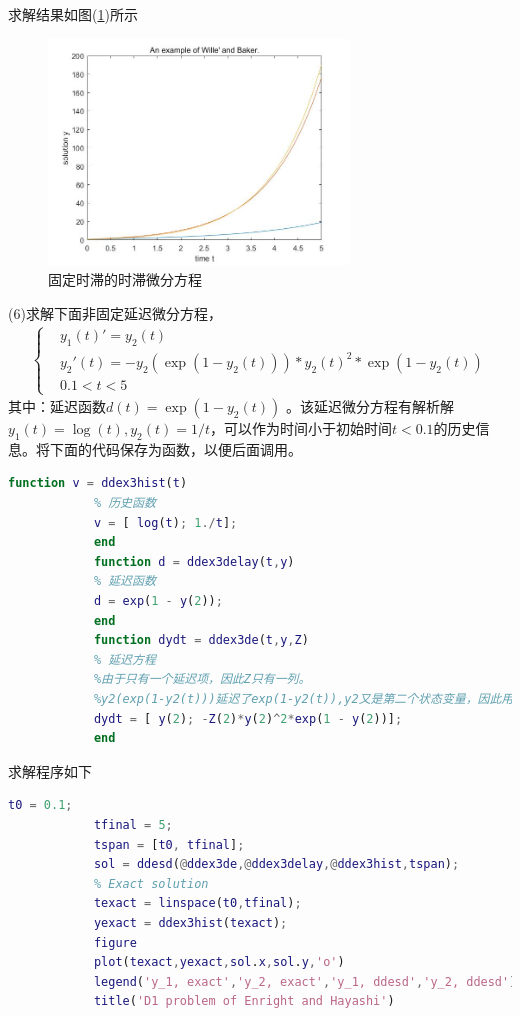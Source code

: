 			求解结果如图(\ref{固定时滞的时滞微分方程})所示
			\begin{figure}[H]
	        \centering
	        \includegraphics[width=8cm]{images/DDEgudingshizhi.jpg}
	        \caption{固定时滞的时滞微分方程}
	        \label{固定时滞的时滞微分方程}
	        \end{figure}
	        (6)求解下面非固定延迟微分方程，
	        \begin{align*}
			\left\{
			\begin{aligned}
			& y_1(t)'=y_2(t)\\
			& y_2'(t)=-y_2(\exp(1-y_2(t)))*y_2(t)^2*\exp(1-y_2(t))\\
			& 0.1<t<5
			\end{aligned}
			\right.
	        \end{align*}
	        其中：延迟函数$d(t) = \exp(1-y_2(t))$ 。该延迟微分方程有解析解 $y_1(t) = \log (t),y_2(t)=1/t$，可以作为时间小于初始时间$t<0.1$的历史信息。将下面的代码保存为函数，以便后面调用。
	        \begin{lstlisting}[language = Matlab]
			 function v = ddex3hist(t)
		    % 历史函数
		    v = [ log(t); 1./t];
		    end
		    function d = ddex3delay(t,y)
		    % 延迟函数
		    d = exp(1 - y(2));
		    end
		    function dydt = ddex3de(t,y,Z)
		    % 延迟方程
		    %由于只有一个延迟项，因此Z只有一列。
		    %y2(exp(1-y2(t)))延迟了exp(1-y2(t)),y2又是第二个状态变量，因此用Z（2）表示。
		    dydt = [ y(2); -Z(2)*y(2)^2*exp(1 - y(2))];
		    end
	        \end{lstlisting}
	        求解程序如下
	        \begin{lstlisting}[language = Matlab]
			t0 = 0.1;
			tfinal = 5;
			tspan = [t0, tfinal];
			sol = ddesd(@ddex3de,@ddex3delay,@ddex3hist,tspan);
			% Exact solution
			texact = linspace(t0,tfinal);
			yexact = ddex3hist(texact);
			figure
			plot(texact,yexact,sol.x,sol.y,'o')
			legend('y_1, exact','y_2, exact','y_1, ddesd','y_2, ddesd')
			title('D1 problem of Enright and Hayashi')
	        \end{lstlisting}
